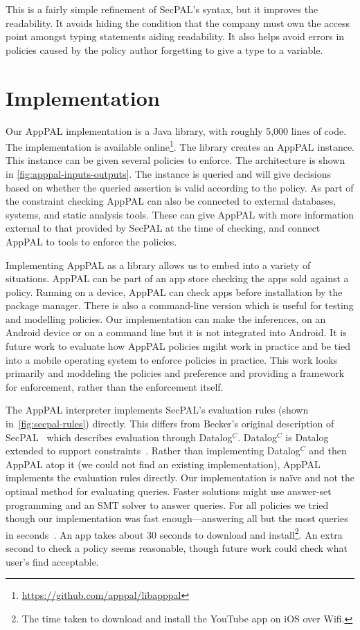 \documentclass[thesis.tex]{subfiles}
\begin{document}
This is a fairly simple refinement of SecPAL's syntax, but it improves the
readability. It avoids hiding the condition that the company must own the access
point amongst typing statements aiding readability. It also helps avoid errors
in policies caused by the policy author forgetting to give a type to a variable.

\section{Implementation}
\label{sec:implementation}

Our AppPAL implementation is a Java library, with roughly 5,000 lines of code.
The implementation is available online\footnote{\url{https://github.com/apppal/libapppal}}.
The library creates an AppPAL instance.
This instance can be given several policies to enforce. 
The architecture is shown in \autoref{fig:apppal-inputs-outputs}.
The instance is queried and will give decisions based on whether the queried assertion is valid according to the policy.
As part of the constraint checking AppPAL can also be connected to external databases, systems, and static analysis tools.
These can give AppPAL with more information external to that provided by SecPAL at the time of checking, and connect AppPAL to tools to enforce the policies.

Implementing AppPAL as a library allows us to embed into a variety of
situations.  AppPAL can be part of an app store checking the apps sold against
a policy.  Running on a device, AppPAL can check apps before installation by
the package manager.  There is also a command-line version which is useful for
testing and modelling policies.  Our implementation can make the inferences, on
an Android device or on a command line but it is not integrated into Android.
It is future work to evaluate how AppPAL policies mgiht work in practice and be
tied into a mobile operating system to enforce policies in practice.  This work
looks primarily and moddeling the policies and preference and providing a
framework for enforcement, rather than the enforcement itself.

The AppPAL interpreter implements SecPAL's evaluation rules (shown in~\autoref{fig:secpal-rules}) directly.
This differs from Becker's original description of SecPAL~\cite{becker_secpal:_2010} which describes evaluation through Datalog$^C$.
Datalog$^C$ is Datalog extended to support constraints~\cite{li_datalog_2003}.
Rather than implementing Datalog$^C$ and then AppPAL atop it (we could not find an existing implementation), AppPAL implements the evaluation rules directly.
Our implementation is na\"ive and not the optimal method for evaluating queries.
Faster solutions might use answer-set programming and an SMT solver to answer queries.
For all policies we tried though our implementation was fast enough---answering all but the most queries in seconds~\cite{hallett_apppal_2016}.  An app takes about 30 seconds to download and install\footnote{The time taken to download and install the YouTube app on iOS over Wifi.}. An extra second to check a policy seems reasonable, though future work could check what user's find acceptable.
\end{document}
